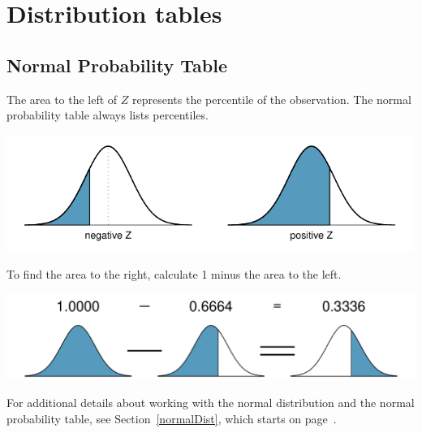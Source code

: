 \chapter{Distribution tables}
\label{distributionTables}

\section{Normal Probability Table}
\label{normalProbabilityTable}

The area to the left of $Z$ represents the percentile of the observation. The normal probability table always lists percentiles.
\begin{center}
\includegraphics[height=1.5in]{extraTeX/appendix/figures/normalTails/normalTails}
\end{center}
To find the area to the right, calculate 1 minus the area to the left.\vspace{1mm}
\begin{center}
\includegraphics[height=1.1in]{extraTeX/appendix/figures/normalTails/subtractingArea/subtractingArea}\vspace{3mm}
\end{center}
For additional details about working with the normal distribution and the normal probability table, see Section~\ref{normalDist}, which starts on page~\pageref{normalDist}.


